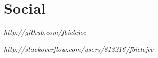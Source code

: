 \documentclass[a4paper, oneside, final]{scrartcl}
\newenvironment{lyxlist}[1]
{\begin{list}{}
{\settowidth{\labelwidth}{#1}
 \setlength{\leftmargin}{\labelwidth}
 \addtolength{\leftmargin}{\labelsep}
 \renewcommand{\makelabel}[1]{##1\hfil}}}
{\end{list}}
\newcommand{\noun}[1]{\textsc{#1}}
\begin{document}
\begin{center}
\begin{lyxlist}{00.00.0000}
\end{lyxlist}



 
% 
% 
 

\section{Social}
 
 \begin{lyxlist}{00.00.0000}
 \item [{\noun{\scriptsize github}}] \emph{http://github.com/fbielejec } 
 
 \item [{\noun{\scriptsize StackOverflow}}] \emph{http://stackoverflow.com/users/813216/fbielejec } 
 
\end{lyxlist} 
    
\end{center}
\end{document}
